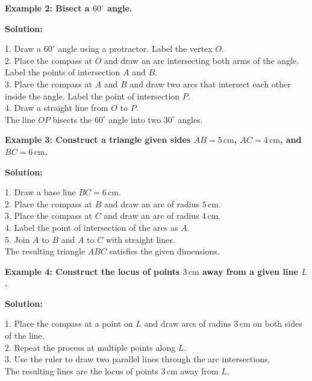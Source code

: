 \begin{flushleft}
	\textbf{Example 2: Bisect a $60^\circ$ angle.}
	
	\vspace{0.5cm}
	\textbf{Solution:}
	\vspace{0.5cm}
	
	1. Draw a $60^\circ$ angle using a protractor. Label the vertex $O$. \\
	2. Place the compass at $O$ and draw an arc intersecting both arms of the angle. Label the points of intersection $A$ and $B$. \\
	3. Place the compass at $A$ and $B$ and draw two arcs that intersect each other inside the angle. Label the point of intersection $P$. \\
	4. Draw a straight line from $O$ to $P$. \\
	The line $OP$ bisects the $60^\circ$ angle into two $30^\circ$ angles.
\end{flushleft}

\begin{flushleft}
	\textbf{Example 3: Construct a triangle given sides $AB = 5 \, \text{cm}$, $AC = 4 \, \text{cm}$, and $BC = 6 \, \text{cm}$.}
	
	\vspace{0.5cm}
	\textbf{Solution:}
	\vspace{0.5cm}
	
	1. Draw a base line $BC = 6 \, \text{cm}$. \\
	2. Place the compass at $B$ and draw an arc of radius $5 \, \text{cm}$. \\
	3. Place the compass at $C$ and draw an arc of radius $4 \, \text{cm}$. \\
	4. Label the point of intersection of the arcs as $A$. \\
	5. Join $A$ to $B$ and $A$ to $C$ with straight lines. \\
	The resulting triangle $ABC$ satisfies the given dimensions.
\end{flushleft}

\begin{flushleft}
	\textbf{Example 4: Construct the locus of points $3 \, \text{cm}$ away from a given line $L$.}
	
	\vspace{0.5cm}
	\textbf{Solution:}
	\vspace{0.5cm}
	
	1. Place the compass at a point on $L$ and draw arcs of radius $3 \, \text{cm}$ on both sides of the line. \\
	2. Repeat the process at multiple points along $L$. \\
	3. Use the ruler to draw two parallel lines through the arc intersections. \\
	The resulting lines are the locus of points $3 \, \text{cm}$ away from $L$.
\end{flushleft}

